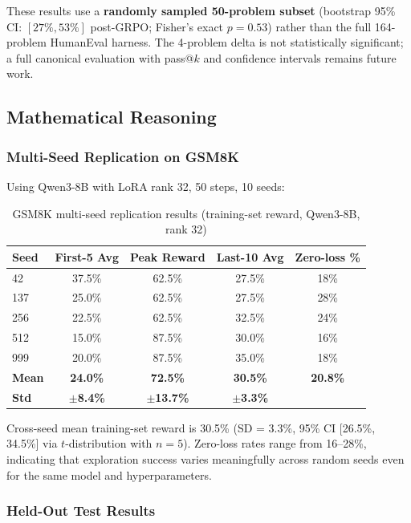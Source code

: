 \documentclass{article}
\begin{document}
These results use a \textbf{randomly sampled 50-problem subset} (bootstrap 95\% CI: $[27\%, 53\%]$ post-GRPO; Fisher's exact $p{=}0.53$) rather than the full 164-problem HumanEval harness. The 4-problem delta is not statistically significant; a full canonical evaluation with pass@$k$ and confidence intervals remains future work.

\subsection{Mathematical Reasoning}

\subsubsection{Multi-Seed Replication on GSM8K}

Using Qwen3-8B with LoRA rank 32, 50 steps, 10 seeds:

\begin{table}[htbp]
    \centering
    \caption{GSM8K multi-seed replication results (training-set reward, Qwen3-8B, rank 32)}
    \begin{tabular}{lcccc}
        \toprule
        Seed & First-5 Avg & Peak Reward & Last-10 Avg & Zero-loss \% \\
        \midrule
        42  & 37.5\% & 62.5\% & 27.5\% & 18\% \\
        137 & 25.0\% & 62.5\% & 27.5\% & 28\% \\
        256 & 22.5\% & 62.5\% & 32.5\% & 24\% \\
        512 & 15.0\% & 87.5\% & 30.0\% & 16\% \\
        999 & 20.0\% & 87.5\% & 35.0\% & 18\% \\
        \midrule
        \textbf{Mean} & \textbf{24.0\%} & \textbf{72.5\%} & \textbf{30.5\%} & \textbf{20.8\%} \\
        \textbf{Std} & \textbf{$\pm$8.4\%} & \textbf{$\pm$13.7\%} & \textbf{$\pm$3.3\%} & \\
        \bottomrule
    \end{tabular}
    \label{tab:multiseed}
\end{table}

Cross-seed mean training-set reward is 30.5\% (SD = 3.3\%, 95\% CI [26.5\%, 34.5\%] via $t$-distribution with $n=5$). Zero-loss rates range from 16--28\%, indicating that exploration success varies meaningfully across random seeds even for the same model and hyperparameters.

\subsubsection{Held-Out Test Results}
\label{sec:gsm8k_heldout}
\end{document}
